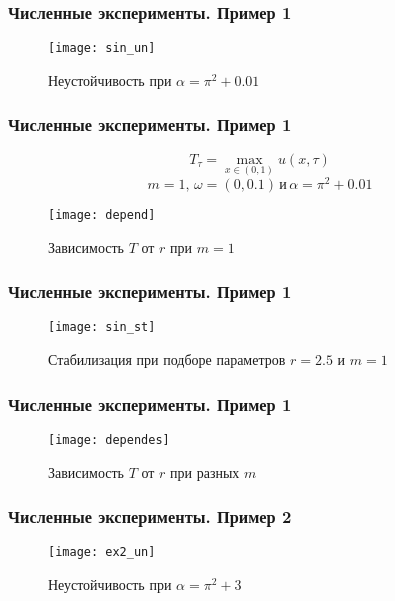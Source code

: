 \documentclass{beamer}
\begin{document}
\begin{frame}
\frametitle{Численные эксперименты. Пример 1}

\begin{figure}[H]
  \centering
  \texttt{[image: sin\_un]}
  \def\figurename{рис}
  \caption{Неустойчивость при $\alpha = \pi^2 + 0.01$}
\end{figure}



\end{frame}

\begin{frame}
\frametitle{Численные эксперименты. Пример 1}

\begin{block}{}
\begin{equation}
	T_{\tau} = \max\limits_{x \in (0, 1)}{u(x, \tau)}
\end{equation}
\begin{equation}
	m = 1, \, \omega = (0, 0.1) \, \text{и} \, \alpha = \pi^2 + 0.01
\end{equation}
\end{block}

\begin{figure}[H]
  \centering
  \texttt{[image: depend]}
  \caption{Зависимость $T$ от $r$ при $m = 1$}
\end{figure}


\end{frame}

\begin{frame}
\frametitle{Численные эксперименты. Пример 1}

\begin{figure}[H]
  \centering
  \texttt{[image: sin\_st]}
  \def\figurename{рис}
  \caption{Стабилизация при подборе параметров $r = 2.5$ и $m = 1$}
\end{figure}


\end{frame}

\begin{frame}
\frametitle{Численные эксперименты. Пример 1}

\begin{figure}[H]
  \centering
  \texttt{[image: dependes]}
  \def\figurename{рис}
  \caption{Зависимость $T$ от $r$ при разных $m$}
\end{figure}

\end{frame}

\begin{frame}
\frametitle{Численные эксперименты. Пример 2}

\begin{figure}[H]
  \centering
  \texttt{[image: ex2\_un]}
  \def\figurename{рис}
  \caption{Неустойчивость при $\alpha = \pi^2 + 3$}
\end{figure}

\end{frame}
\end{document}
